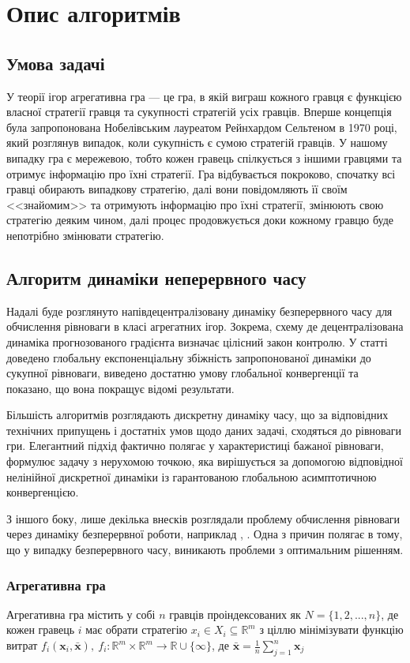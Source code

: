 \documentclass[a4paper]{article}
\begin{document}
\section{Опис алгоритмів}
\subsection{Умова задачі}
У теорії ігор агрегативна гра — це гра, в якій виграш кожного гравця є функцією власної стратегії гравця та сукупності стратегій усіх гравців. Вперше концепція була запропонована Нобелівським лауреатом Рейнхардом Сельтеном в 1970 році, який розглянув випадок, коли сукупність є сумою стратегій гравців. У нашому випадку гра є мережевою, тобто кожен гравець спілкується з іншими гравцями та отримує інформацію про їхні стратегії. Гра відбувається покроково, спочатку всі гравці обирають випадкову стратегію, далі вони повідомляють її своїм <<знайомим>> та отримують інформацію про їхні стратегії, змінюють свою стратегію деяким чином, далі процес продовжується доки кожному гравцю буде непотрібно змінювати стратегію.

\subsection{Алгоритм динаміки неперервного часу~\cite{Article1}}
Надалі буде розглянуто напівдецентралізовану динаміку безперервного часу для обчислення рівноваги в класі агрегатних ігор. Зокрема, схему де децентралізована динаміка прогнозованого градієнта визначає цілісний закон контролю. У статті~\cite{Article1} доведено глобальну експоненціальну збіжність запропонованої динаміки до сукупної рівноваги, виведено достатню умову глобальної конвергенції та показано, що вона покращує відомі результати.

Більшість алгоритмів розглядають дискретну динаміку часу, що за відповідних технічних припущень і достатніх умов щодо даних задачі, сходяться до рівноваги гри. Елегантний підхід фактично полягає у характеристиці бажаної рівноваги, формулює задачу з нерухомою точкою, яка вирішується за допомогою відповідної нелінійної дискретної динаміки із гарантованою глобальною асимптотичною конвергенцією.

З іншого боку, лише декілька внесків розглядали проблему обчислення рівноваги через динаміку безперервної роботи, наприклад \cite{Cite22}, \cite{Cite21}. Одна з причин полягає в тому, що у випадку безперервного часу, виникають проблеми з оптимальним рішенням.

\subsubsection*{Агрегативна гра}
Агрегативна гра містить у собі $n$ гравців проіндексованих як $N = \{1, 2, ... , n\}$, де кожен гравець $i$ має обрати стратегію $x_i \in X_i \subseteq \mathbb{R}^m$ з ціллю мінімізувати функцію витрат $f_i (\mathbf{x}_i, \mathbf{\bar{x}}),~f_i: \mathbb{R}^m \times \mathbb{R}^m \rightarrow \mathbb{R} \cup \{ \infty \}$, де $\mathbf{\bar{x}} = \frac{1}{n} \sum_{j=1}^{n} \mathbf{x}_j$
\end{document}
